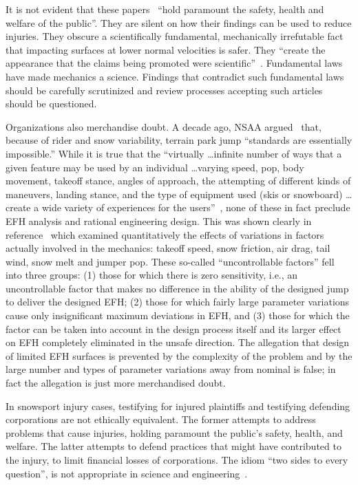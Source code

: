 \documentclass{article}
\begin{document}
It is not evident that these papers~\cite{Shealy2010,Shealy2015,Scher2015}
``hold paramount the safety, health and welfare of the public''. They are
silent on how their findings can be used to reduce injuries. They obscure a
scientifically fundamental, mechanically irrefutable fact that impacting
surfaces at lower normal velocities is safer. They ``create the appearance that
the claims being promoted were scientific''~\cite[page 244]{Oreskes2010}.
Fundamental laws have made mechanics a science. Findings that contradict such
fundamental laws should be carefully scrutinized and review processes accepting
such articles should be questioned.

Organizations also merchandise doubt. A decade ago, NSAA argued~\cite{NSAA2008}
that, because of rider and snow variability, terrain park jump ``standards are
essentially impossible.'' While it is true that the ``virtually \ldots infinite
number of ways that a given feature may be used by an individual \ldots varying
speed, pop, body movement, takeoff stance, angles of approach, the attempting
of different kinds of maneuvers, landing stance, and the type of equipment used
(skis or snowboard) \ldots create a wide variety of experiences for the
users''~\cite{NSAA2008}, none of these in fact preclude EFH analysis and rational engineering design.
This was shown clearly in reference~\cite{Hubbard2012} which examined
quantitatively the effects of variations in factors actually involved in the
mechanics: takeoff speed, snow friction, air drag, tail wind, snow melt and
jumper pop. These so-called ``uncontrollable factors'' fell into three groups:
(1) those for which there is zero sensitivity, i.e., an uncontrollable factor
that makes no difference in the ability of the designed jump to deliver the
designed EFH; (2) those for which fairly large parameter variations cause only
insignificant maximum deviations in EFH, and (3) those for which the factor can
be taken into account in the design process itself and its larger effect on EFH
completely eliminated in the unsafe direction. The allegation that design of
limited EFH surfaces is prevented by the complexity of the problem and by the
large number and types of parameter variations away from nominal is false; in
fact the allegation is just more merchandised doubt.

In snowsport injury cases, testifying for injured plaintiffs and testifying
defending corporations are not ethically equivalent. The former attempts to
address problems that cause injuries, holding paramount the public's safety,
health, and welfare. The latter attempts to defend practices that might have
contributed to the injury, to limit financial losses of corporations. The idiom
``two sides to every question'', is not appropriate in science and
engineering~\cite[page 268]{Oreskes2010}.
\end{document}

